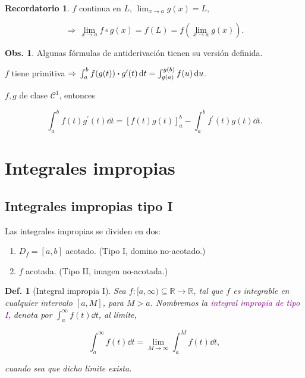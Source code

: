 \documentclass{article}
\theoremstyle{definicion}
\newtheorem{definicion}{Def.}
\theoremstyle{definition}             %
\theoremstyle{definition}             %
\theoremstyle{definition}
\newtheorem{record}{Recordatorio}
\theoremstyle{definition}
\theoremstyle{observacion}
\newtheorem{obs}{Obs.}
\theoremstyle{definition}
\theoremstyle{plain}
\theoremstyle{definition}
\theoremstyle{afirmacion}
\theoremstyle{definition}
\begin{document}
    \begin{record}
        \(f\) continua en \(L\), \(\lim_{x\to a} g(x) = L\),

        \begin{equation*}
            \Rightarrow\, \lim_{x\to a} f \circ g (x) = f(L) = f(\lim_{x\to a}g(x)).
        \end{equation*}
    \end{record}

    \begin{obs}
        Algunas fórmulas de antiderivación tienen su versión definida.
    \end{obs}

    \begin{aff}
        \(f\) tiene primitiva \(\Rightarrow\, \int_{a}^{b}f(g(t))\vdot g^{\prime}(t)\dd{t} = \int_{g(a)}^{g(b)}f(u) \dd{u}\).
    \end{aff}

    \begin{aff}
        \(f,g\) de clase \(\mathscr{C}^{1}\), entonces 

        \begin{equation*}
            \int_{a}^{b}f(t)g^{\prime}(t)\dd{t} = [f(t)g(t)]_{a}^{b} - \int_{a}^{b}f^{\prime}(t)g(t)\dd{t}.
        \end{equation*}
    \end{aff}

    \section{Integrales impropias}

    \subsection{Integrales impropias tipo I}

    Las integrales impropias se dividen en dos:

    \begin{enumerate}
        \item \(D_{f} = [a,b]\) acotado. (Tipo I, domino no-acotado.)
        \item \(f\) acotada. (Tipo II, imagen no-acotada.)
    \end{enumerate}

    \begin{definicion}[Integral impropia I]
        Sea \(f\colon [a,\infty)\subseteq \mathbb{R}\to\mathbb{R}\), tal que \(f\) es integrable en cualquier intervalo \([a, M]\), para \(M > a\). Nombremos la \textcolor{purple}{integral impropia de tipo I}, denota por \(\int_{a}^{\infty}f(t)\dd{t}\), al límite,

        \begin{equation*}
            \int_{a}^{\infty}f(t)\dd{t} = \lim_{M \to \infty} \int_{a}^{M}f(t)\dd{t},
        \end{equation*}

        cuando sea que dicho límite exista.
    \end{definicion}
\end{document}
